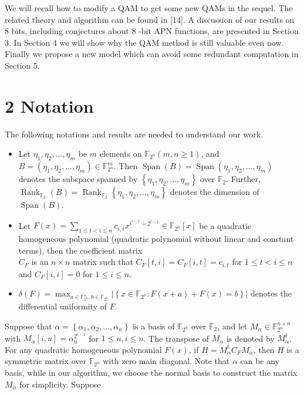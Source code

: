 \documentclass[10pt]{article}
\begin{document}
We will recall how to modify a QAM to get some new QAMs in the sequel. The related theory and algorithm can be found in [14]. A discussion of our results on 8 bits, including conjectures about 8 -bit APN functions, are presented in Section 3. In Section 4 we will show why the QAM method is still valuable even now. Finally we propose a new model which can avoid some redundant computation in Section 5.

\section*{2 Notation}
The following notations and results are needed to understand our work.

\begin{itemize}
  \item Let $\eta_{1}, \eta_{2}, \ldots, \eta_{m}$ be $m$ elements on $\mathbb{F}_{2^{n}}(m, n \geq 1)$, and $B=\left(\eta_{1}, \eta_{2}, \ldots, \eta_{m}\right) \in \mathbb{F}_{2^{n}}^{m}$. Then $\operatorname{Span}(B)=\operatorname{Span}\left(\eta_{1}, \eta_{2}, \ldots, \eta_{m}\right)$ denotes the subspace spanned by $\left\{\eta_{1}, \eta_{2}, \ldots, \eta_{m}\right\}$ over $\mathbb{F}_{2}$. Further, $\operatorname{Rank}_{\mathbb{F}_{2}}(B)=\operatorname{Rank}_{\mathbb{F}_{2}}\left\{\eta_{1}, \eta_{2}, \ldots, \eta_{m}\right\}$ denotes the dimension of $\operatorname{Span}(B)$.
  \item Let $F(x)=\sum_{1 \leq t<i \leq n} c_{i, t} x^{i^{i-1}+2^{t-1}} \in \mathbb{F}_{2^{n}}[x]$ be a quadratic homogeneous polynomial (quadratic polynomial without linear and constant terms), then the coefficient matrix\\
$C_{F}$ is an $n \times n$ matrix such that $C_{F}[t, i]=C_{F}[i, t]=c_{i, t}$ for $1 \leq t<i \leq n$ and $C_{F}[i, i]=0$ for $1 \leq i \leq n$.
  \item $\delta(F)=\max _{a \in \mathbb{F}_{2^{n}}^{\star}, b \in \mathbb{F}_{2^{n}}}\left|\left\{x \in \mathbb{F}_{2^{n}}: F(x+a)+F(x)=b\right\}\right|$ denotes the differential uniformity of $F$.
\end{itemize}

Suppose that $\alpha=\left\{\alpha_{1}, \alpha_{2}, \ldots, \alpha_{n}\right\}$ is a basis of $\mathbb{F}_{2^{n}}$ over $\mathbb{F}_{2}$, and let $M_{\alpha} \in \mathbb{F}_{2^{n}}^{n \times n}$ with $M_{\alpha}[i, u]=\alpha_{u}^{2^{i-1}}$ for $1 \leq u, i \leq n$. The transpose of $M_{\alpha}$ is denoted by $M_{\alpha}^{t}$. For any quadratic homogeneous polynomial $F(x)$, if $H=M_{\alpha}^{t} C_{F} M_{\alpha}$, then $H$ is a symmetric matrix over $\mathbb{F}_{2^{n}}$ with zero main diagonal. Note that $\alpha$ can be any basis, while in our algorithm, we choose the normal basis to construct the matrix $M_{\alpha}$ for simplicity. Suppose
\end{document}

